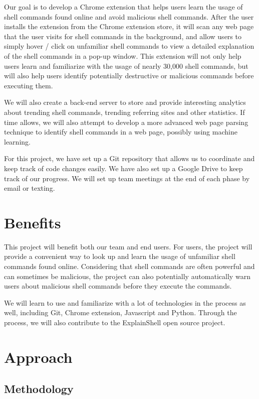\documentclass[11pt]{article}
\begin{document}
Our goal is to develop a Chrome extension that helps users learn the usage of shell commands found online and avoid malicious shell commands. After the user installs the extension from the Chrome extension store, it will scan any web page that the user visits for shell commands in the background, and allow users to simply hover / click on unfamiliar shell commands to view a detailed explanation of the shell commands in a pop-up window. This extension will not only help users learn and familiarize with the usage of nearly 30,000 shell commands, but will also help users identify potentially destructive or malicious commands before executing them. 

We will also create a back-end server to store and provide interesting analytics about trending shell commands, trending referring sites and other statistics. If time allows, we will also attempt to develop a more advanced web page parsing technique to identify shell commands in a web page, possibly using machine learning.

For this project, we have set up a Git repository that allows us to coordinate and keep track of code changes easily. We have also set up a Google Drive to keep track of our progress. We will set up team meetings at the end of each phase by email or texting.

\section{Benefits}

This project will benefit both our team and end users. For users, the project will provide a convenient way to look up and learn the usage of unfamiliar shell commands found online. Considering that shell commands are often powerful and can sometimes be malicious, the project can also potentially automatically warn users about malicious shell commands before they execute the commands. 

We will learn to use and familiarize with a lot of technologies in the process as well, including Git, Chrome extension, Javascript and Python. Through the process, we will also contribute to the ExplainShell open source project.

\section{Approach}
\subsection{Methodology}
\end{document}
